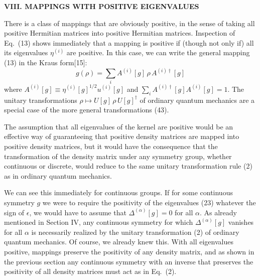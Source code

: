 \vspace{20pt}

\begin{center}
{\bf VIII.  MAPPINGS WITH POSITIVE EIGENVALUES}
\end{center}

There is a class of mappings that are obviously positive, in the sense of taking all positive Hermitian matrices into positive Hermitian matrices.  Inspection of Eq.~(13)  shows immediately that a mapping is positive if (though not only if) all its eigenvalues $\eta^{(i)}$ are positive.  In this case, we can write the general mapping (13) in the Kraus form[15]:
\begin{equation}
g(\rho)=\sum_i A^{(i)}[g]\,\rho\,A^{(i)\dagger}[g]
\end{equation}
where $A^{(i)}[g]\equiv \eta^{(i)}[g]^{1/2} u^{(i)}[g]$ and $\sum_i A^{(i)\dagger}[g]A^{(i)}[g]=1$.  The  unitary transformations  $\rho\mapsto U[g]\,\rho\,U[g]^\dagger$ of ordinary quantum mechanics are a special case of the more general transformations (43). 

The assumption that all eigenvalues of the kernel are positive would be an effective way of guaranteeing that positive density matrices are mapped into positive density matrices, but it would have the  consequence that the transformation of the density matrix under any symmetry group, whether continuous or discrete, would reduce to the same unitary transformation rule (2)  as in ordinary quantum mechanics.  

We can see this immediately for continuous groups.  If for some continuous symmetry $g$ we were to require  the positivity of the eigenvalues (23) whatever the sign of $\epsilon$, we would have to assume that $\Delta^{(\alpha)}[g]=0$ for all $\alpha$.  As already mentioned in Section IV, any continuous symmetry for which $\Delta^{(\alpha)}[g]$ vanishes for all $\alpha$ is necessarily realized by the unitary transformation (2) of ordinary quantum mechanics.  Of course, we already knew this.  With all eigenvalues positive, mappings preserve the positivity of any density matrix, and as shown in the previous section any continuous symmetry with an inverse that preserves the positivity of all density matrices must act as in Eq.~(2).

